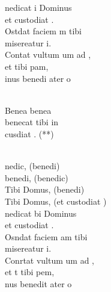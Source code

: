 \documentclass[12pt]{article}
\begin{document}
\begin{multicols*}{2}
\begin{cancion}[Benedicat][]%
	nedicat i Dominus \\
	et custodiat .\\
	Ostdat faciem m tibi\\
	 misereatur i.\\
	Contat vultum um ad ,\\
	et  tibi pam,\\
	inus benedi ater o \\\jump\\
	\begin{chorus}%
	Benea benea \\
	benecat tibi in\\
	 cusdiat . (**)\\
	\end{chorus}%
	\jump\\
	nedic, (benedi)\\
	benedi, (benedic)\\
	Tibi Domus, (benedi)\\
	Tibi Domus, (et custodiat )\\
\jump
	nedicat bi Dominus\\
	et custodiat .\\
	Osndat faciem am tibi\\
	 misereatur i.\\
	Conrtat vultum um ad ,\\
	et t tibi pem,\\
	nus benedit ater o \\\jump\\
	\begin{chorus}%

\end{chorus}
\end{cancion}
\end{multicols*}
\end{document}
